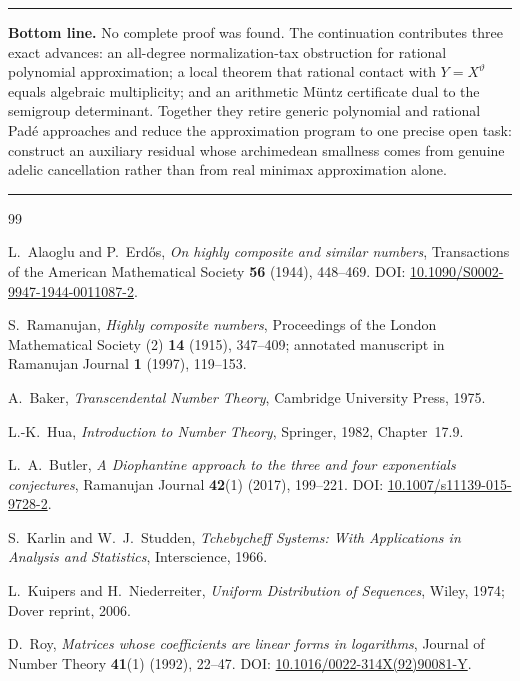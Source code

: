 \documentclass[11pt,oneside]{article}
\theoremstyle{definition}
\theoremstyle{remark}
\newcommand{\thetaq}{\vartheta}
\newenvironment{resultbox}
{\begin{center}\begin{minipage}{0.94\textwidth}\hrule\vspace{0.45em}}
{\vspace{0.35em}\hrule\end{minipage}\end{center}}
\begin{document}
\begin{resultbox}
\textbf{Bottom line.}
No complete proof was found.  The continuation contributes three exact advances: an all-degree
normalization-tax obstruction for rational polynomial approximation; a local theorem that
rational contact with \(Y=X^{\thetaq}\) equals algebraic multiplicity; and an arithmetic
M\"untz certificate dual to the semigroup determinant.  Together they retire generic
polynomial and rational Pad\'e approaches and reduce the approximation program to one precise
open task: construct an auxiliary residual whose archimedean smallness comes from genuine
adelic cancellation rather than from real minimax approximation alone.
\end{resultbox}

\begin{thebibliography}{99}

L.~Alaoglu and P.~Erd\H{o}s,
\newblock \emph{On highly composite and similar numbers},
\newblock Transactions of the American Mathematical Society \textbf{56} (1944), 448--469.
\newblock DOI:
\href{https://doi.org/10.1090/S0002-9947-1944-0011087-2}{10.1090/S0002-9947-1944-0011087-2}.

S.~Ramanujan,
\newblock \emph{Highly composite numbers},
\newblock Proceedings of the London Mathematical Society (2) \textbf{14} (1915), 347--409;
annotated manuscript in Ramanujan Journal \textbf{1} (1997), 119--153.

A.~Baker,
\newblock \emph{Transcendental Number Theory},
\newblock Cambridge University Press, 1975.

L.-K.~Hua,
\newblock \emph{Introduction to Number Theory},
\newblock Springer, 1982, Chapter~17.9.

L.~A.~Butler,
\newblock \emph{A Diophantine approach to the three and four exponentials conjectures},
\newblock Ramanujan Journal \textbf{42}(1) (2017), 199--221.
\newblock DOI: \href{https://doi.org/10.1007/s11139-015-9728-2}{10.1007/s11139-015-9728-2}.

S.~Karlin and W.~J.~Studden,
\newblock \emph{Tchebycheff Systems: With Applications in Analysis and Statistics},
\newblock Interscience, 1966.

L.~Kuipers and H.~Niederreiter,
\newblock \emph{Uniform Distribution of Sequences},
\newblock Wiley, 1974; Dover reprint, 2006.

D.~Roy,
\newblock \emph{Matrices whose coefficients are linear forms in logarithms},
\newblock Journal of Number Theory \textbf{41}(1) (1992), 22--47.
\newblock DOI:
\href{https://doi.org/10.1016/0022-314X(92)90081-Y}{10.1016/0022-314X(92)90081-Y}.


\end{thebibliography}
\end{document}
